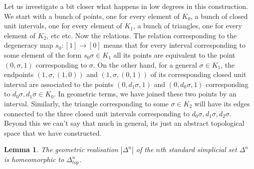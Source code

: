 \documentclass[a4paper]{amsart}
\numberwithin{figure}{section}
\theoremstyle{theorem}
\newtheorem{lemm}[thm]{Lemma}
\theoremstyle{definition}
\newtheorem{exam}[thm]{Example}
\newcommand{\ZZ}{\mathbb{Z}}
\begin{document}
Let us investigate a bit closer what happens in low degrees in this construction. We start with a bunch of points, one for every element of $K_0$, a bunch of closed unit intervals, one for every element of $K_1$, a bunch of triangles, one for every element of $K_2$, etc etc. Now the relations. The relation corresponding to the degeneracy map $s_0: [1] \to [0]$ means that for every interval corresponding to some element of the form $s_0\sigma \in K_1$ all its points are equivalent to the point $(0, \sigma, 1)$ corresponding to $\sigma$. On the other hand, for a general $\sigma \in K_1$, the endpoints $(1, \sigma, (1,0))$ and $(1, \sigma, (0,1))$ of its corresponding closed unit interval are associated to the points $(0, d_1\sigma, 1)$ and $(0, d_0\sigma, 1)$ corresponding to $d_0\sigma, d_1\sigma \in K_0$. In geometric terms, we have joined these two points by an interval. Similarly, the triangle corresponding to some $\sigma \in K_2$ will have its edges  connected to the three closed unit intervals  corresponding to $d_0 \sigma, d_1 \sigma, d_2\sigma$. Beyond this we can't say that much in general, its just an abstract topological space that we have constructed. \\

%
%

\begin{mdframed}
\begin{lemm} \label{lemm:deltareal}
The geometric realisation $|\Delta^n|$ of the $n$th standard simplicial set $\Delta^n$ is homeomorphic to $\Delta^n_{top}$. 
\end{lemm}
\end{mdframed}
\end{document}
